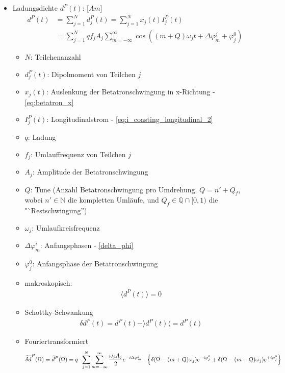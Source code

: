\documentclass[12pt]{article}%
\renewcommand{\phi}{\varphi}
\newcommand{\itemf}{\item[$\circ$]}
\begin{document}
\begin{itemize}

\item Ladungsdichte $d^P(t)$: [$Am$]
\begin{subequations}
\begin{align}
d^P(t) &= \sum_{j=1}^{N} d_j^P(t) = \sum_{j=1}^{N} x_j(t) I_j^P(t) \\
 &= \sum_{j=1}^{N} q f_j A_j \sum_{m=-\infty}^{\infty} \cos((m+Q)\omega_j t + \Delta \phi_m^j + \phi_j^0)
\end{align}
\end{subequations}

	\begin{itemize}
	
		\item $N$: Teilchenanzahl
		\item $d_j^P(t)$: Dipolmoment von Teilchen $j$
		\item $x_j(t)$: Auslenkung der Betatronschwingung in x-Richtung - \eqref{eq:betatron_x}
		\item $I^P_j(t)$: Longitudinalstrom - \eqref{eq:i_coasting_longitudinal_2}
		\item $q$: Ladung
		\item $f_j$: Umlauffrequenz von Teilchen $j$
		\item $A_j$: Amplitude der Betatronschwingung
		\item $Q$: Tune (Anzahl Betatronschwingung pro Umdrehung. $Q = n' + Q_f$, wobei $n' \in \mathbb{N}$ die kompletten Umläufe, und $Q_f \in \mathbb{Q} \cap [0,1)$ die "`Restschwingung'')
		\item $\omega_j$: Umlaufkreisfrequenz
		\item $\Delta \phi_m^i$: Anfangsphasen - \eqref{delta_phi}
		\item $\phi_j^0$: Anfangsphase der Betatronschwingung
	
	\end{itemize}

	\begin{itemize}
	
		\itemf makroskopisch:
		\begin{align}
			\langle d^P(t) \rangle = 0
		\end{align}
		
		\itemf Schottky-Schwankung
		\begin{align}
			\delta d^P(t) = d^P(t) - \rangle d^P(t) \langle = d^P(t)
		\end{align}
	
		\itemf Fouriertransformiert
		\begin{dmath}
			\widetilde{\delta d}^P(\Omega) = \widetilde{d}^P(\Omega) = q \cdot  \sum_{j=1}^{N} \sum_{m=-\infty}^{\infty} \frac{\omega_j A_j}{2} e^{-i \Delta \phi^j_m} \cdot \\
			\left\lbrace \delta(\Omega - (m + Q) \omega_j) e^{-i \phi_j^0} + \delta(\Omega - (m - Q)\omega_j)e^{+i\phi_j^0} \right\rbrace
		\end{dmath}
	

\end{itemize}
\end{itemize}
\end{document}
